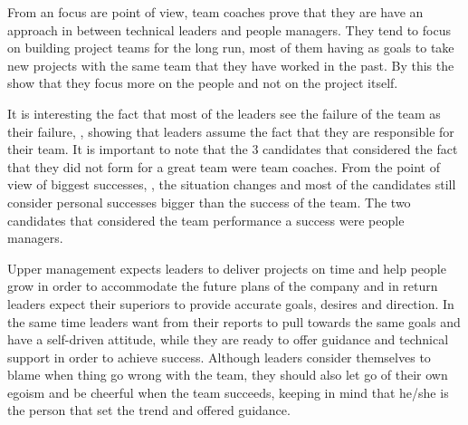 From an focus are point of view, team coaches prove that they are have an approach in between technical leaders and people managers. They tend to focus on building project teams for the long run, most of them having as goals to take new projects with the same team that they have worked in the past. By this the show that they focus more on the people and not on the project itself.

It is interesting the fact that most of the leaders see the failure of the team as their failure, , showing that leaders assume the fact that they are responsible for their team. It is important to note that the 3 candidates that considered the fact that they did not form for a great team were team coaches. From the point of view of biggest successes, , the situation changes and most of the candidates still consider personal successes bigger than the success of the team. The two candidates that considered the team performance a success were people managers.

Upper management expects leaders to deliver projects on time and help people grow in order to accommodate the future plans of the company and in return leaders expect their superiors to provide accurate goals, desires and direction. In the same time leaders want from their reports to pull towards the same goals and have a self-driven attitude, while they are ready to offer guidance and technical support in order to achieve success. Although leaders consider themselves to blame when thing go wrong with the team, they should also let go of their own egoism and be cheerful when the team succeeds, keeping in mind that he/she is the person that set the trend and offered guidance. 